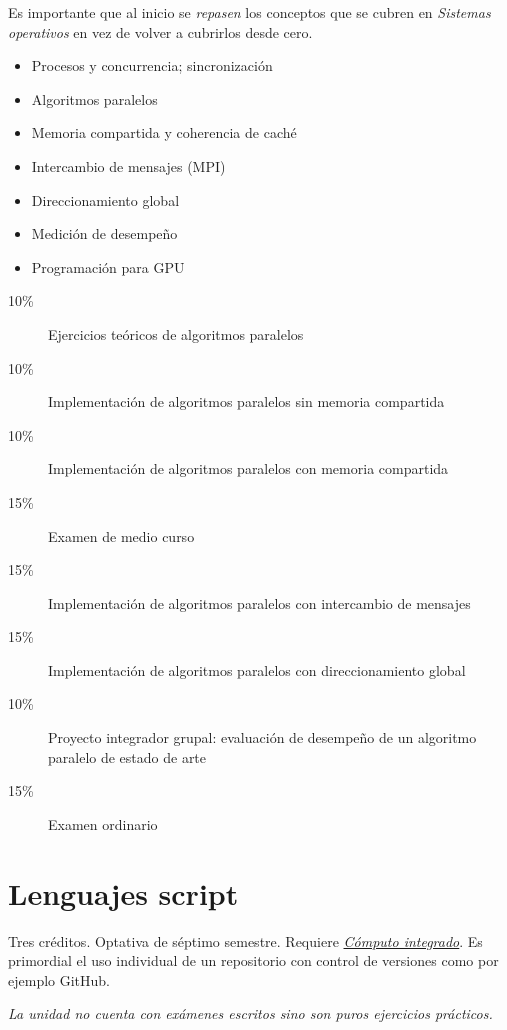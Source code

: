 \documentclass{article}
\begin{document}
\begin{multicols}{4}
Es importante que al inicio se {\em repasen} los conceptos que se
cubren en \emph{Sistemas operativos} en vez de volver a cubrirlos
desde cero. 

\begin{itemize}
\item{Procesos y concurrencia; sincronizaci\'{o}n}
\item{Algoritmos paralelos}
\item{Memoria compartida y coherencia de cach\'{e}}
\item{Intercambio de mensajes (MPI)}
\item{Direccionamiento global}
\item{Medici\'{o}n de desempe\~{n}o}
\item{Programaci\'{o}n para GPU}
\end{itemize}

\begin{description}
\item[10\%]{Ejercicios te\'{o}ricos de algoritmos paralelos}
\item[10\%]{Implementaci\'{o}n de algoritmos paralelos sin memoria compartida}
\item[10\%]{Implementaci\'{o}n de algoritmos paralelos con memoria compartida}    
\item[15\%]{Examen de medio curso}
\item[15\%]{Implementaci\'{o}n de algoritmos paralelos con intercambio de mensajes}
\item[15\%]{Implementaci\'{o}n de algoritmos paralelos con direccionamiento global}        
\item[10\%]{Proyecto integrador grupal: evaluaci\'{o}n de desempe\~{n}o de un
  algoritmo paralelo de estado de arte}
\item[15\%]{Examen ordinario}
\end{description}  

\vfill\null \columnbreak

\hypertarget{ls}{\section*{Lenguajes script}}

Tres cr\'{e}ditos. Optativa de s\'{e}ptimo semestre.  Requiere
\hyperlink{ci}{\em C\'{o}mputo integrado}. Es primordial el uso
individual de un repositorio con control de versiones como
por ejemplo GitHub.

{\em La unidad no cuenta con ex\'{a}menes escritos sino son puros
  ejercicios pr\'{a}cticos.}


\end{multicols}
\end{document}
